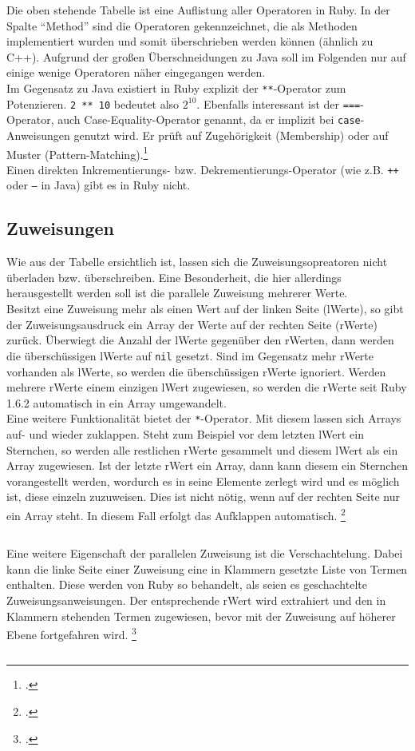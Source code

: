 \documentclass[a4paper, 11pt]{scrreprt}
\begin{document}
Die oben stehende Tabelle ist eine Auflistung aller Operatoren in Ruby. In der Spalte ``Method'' sind die Operatoren gekennzeichnet, die als Methoden implementiert wurden und somit überschrieben werden können (ähnlich zu C++). Aufgrund der großen Überschneidungen zu Java soll im Folgenden nur auf einige wenige Operatoren näher eingegangen werden.\\
Im Gegensatz zu Java existiert in Ruby explizit der \texttt{**}-Operator zum Potenzieren. \texttt{2 ** 10} bedeutet also $2^{10}$. Ebenfalls interessant ist der \texttt{===}-Operator, auch Case-Equality-Operator genannt, da er implizit bei \texttt{case}-Anweisungen genutzt wird. Er prüft auf Zugehörigkeit (Membership) oder auf Muster (Pattern-Matching).\footcite[vgl.][S.106]{ruby_lang}\\
Einen direkten Inkrementierungs- bzw. Dekrementierungs-Operator (wie z.B. \texttt{++} oder \texttt{--} in Java) gibt es in Ruby nicht.

\subsection{Zuweisungen}
Wie aus der Tabelle ersichtlich ist, lassen sich die Zuweisungsopreatoren nicht überladen bzw. überschreiben. Eine Besonderheit, die hier allerdings herausgestellt werden soll ist die parallele Zuweisung mehrerer Werte.\\
Besitzt eine Zuweisung mehr als einen Wert auf der linken Seite (lWerte), so gibt der Zuweisungsausdruck ein Array der Werte auf der rechten Seite (rWerte) zurück. Überwiegt die Anzahl der lWerte gegenüber den rWerten, dann werden die überschüssigen lWerte auf \texttt{nil} gesetzt. Sind im Gegensatz mehr rWerte vorhanden als lWerte, so werden die überschüssigen rWerte ignoriert. Werden mehrere rWerte einem einzigen lWert zugewiesen, so werden die rWerte seit Ruby 1.6.2 automatisch in ein Array umgewandelt.\\
Eine weitere Funktionalität bietet der \texttt{*}-Operator. Mit diesem lassen sich Arrays auf- und wieder zuklappen. Steht zum Beispiel vor dem letzten lWert ein Sternchen, so werden alle restlichen rWerte gesammelt und diesem lWert als ein Array zugewiesen. Ist der letzte rWert ein Array, dann kann diesem ein Sternchen vorangestellt werden, wordurch es in seine Elemente zerlegt wird und es möglich ist, diese einzeln zuzuweisen. Dies ist nicht nötig, wenn auf der rechten Seite nur ein Array steht. In diesem Fall erfolgt das Aufklappen automatisch.
\footcite[vgl.][S.97-100]{ruby_lang}
\inputminted[]{ruby}{zuweisungen1.rb}
Eine weitere Eigenschaft der parallelen Zuweisung ist die Verschachtelung. Dabei kann die linke Seite einer Zuweisung eine in Klammern gesetzte Liste von Termen enthalten. Diese werden von Ruby so behandelt, als seien es geschachtelte Zuweisungsanweisungen.
Der entsprechende rWert wird extrahiert und den in Klammern stehenden Termen zugewiesen, bevor mit der Zuweisung auf höherer Ebene fortgefahren wird.
\footcite[vgl.][S.134-135]{p_ruby}
\inputminted[]{ruby}{zuweisungen2.rb}
\end{document}
